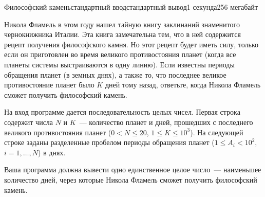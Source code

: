 \begin{problem}{Философский камень}{стандартный ввод}{стандартный вывод}{1 секунда}{256 мегабайт}

Никола Фламель в этом году нашел тайную книгу заклинаний знаменитого чернокнижника Италии. Эта книга замечательна тем, что в ней содержится рецепт получения философского камня. Но этот рецепт будет иметь силу, только если он приготовлен во время великого противостояния планет (когда все планеты системы выстраиваются в одну линию).
Если известны периоды обращения планет (в земных днях), а также то, что последнее великое противостояние планет было $K$ дней тому назад, ответьте, когда Никола Фламель сможет получить философский камень.

\InputFile
На вход программе дается последовательность целых чисел. Первая строка содержит числа $N$ и $K$~--- количество планет и дней, прошедших с последнего великого противостояния планет ($0 < N \leq 20$, $1\leq K \leq 10^{3}$). На следующей строке заданы разделенные пробелом периоды обращения планет ($1\leq A_i < 10^{2}$, $i=1,\ldots, N$) в днях.

\OutputFile
Ваша программа должна вывести одно единственное целое число~--- наименьшее количество дней, через которые Никола Фламель сможет получить философский камень.

\Example

\begin{example}
%
\end{example}

\end{problem}


